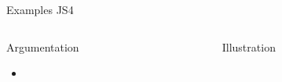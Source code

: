 %
\begin{Frame}{Examples JS4}
  \begin{columns}[t]
    \begin{column}{5cm} %
      \begin{block}{Argumentation}
        \begin{itemize}
        \item 
        \end{itemize}
      \end{block} 
    \end{column}
    
    \begin{column}{5cm} %
      \begin{block}{Illustration}
      \end{block}   
    \end{column}
  \end{columns}  
\end{Frame}



